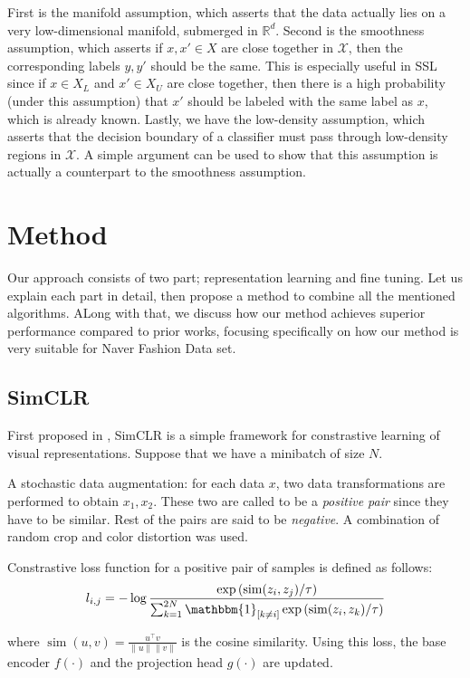 \documentclass[10pt,twocolumn,letterpaper]{article}
\DeclareMathOperator{\similar}{\mathrm{sim}}
\begin{document}
	First is the manifold assumption, which asserts that the data actually lies on a very low-dimensional manifold, submerged in $\mathbb{R}^d$.
	Second is the smoothness assumption, which asserts if $x, x' \in X$ are close together in $\mathcal{X}$, then the corresponding labels $y, y'$ should be the same.
	This is especially useful in SSL since if $x \in X_L$ and $x' \in X_U$ are close together, then there is a high probability (under this assumption) that $x'$ should be labeled with the same label as $x$, which is already known.
	Lastly, we have the low-density assumption, which asserts that the decision boundary of a classifier must pass through low-density regions in $\mathcal{X}$.
	A simple argument\cite{EH20} can be used to show that this assumption is actually a counterpart to the smoothness assumption.
	
	
	\section{Method}
	Our approach consists of two part; representation learning and fine tuning.
	Let us explain each part in detail, then propose a method to combine all the mentioned algorithms.
	ALong with that, we discuss how our method achieves superior performance compared to prior works, focusing specifically on how our method is very suitable for Naver Fashion Data set.
	
	
	\subsection{SimCLR}
	First proposed in \cite{CKNH20}, SimCLR is a simple framework for constrastive learning of visual representations.
	Suppose that we have a minibatch of size $N$.
	
	A stochastic data augmentation: for each data $x$, two data transformations are performed to obtain $x_1, x_2$.
	These two are called to be a {\it positive pair} since they have to be similar.
	Rest of the pairs are said to be {\it negative}.
	A combination of random crop and color distortion was used.
	
	Constrastive loss function for a positive pair of samples is defined as follows:
	\[ l_{i,j} = -\log \frac{\exp\left(\similar(z_i, z_j) / \tau\right)}{\sum_{k=1}^{2N} \mathbbm{1}_{[k \not= i]} \exp\left( \similar(z_i, z_k) / \tau \right)} \]
	
	where $\similar(u, v) = \frac{u^\intercal v}{\lVert u \rVert \lVert v \rVert}$ is the cosine similarity.
	Using this loss, the base encoder $f(\cdot)$ and the projection head $g(\cdot)$ are updated.
	
\end{document}
